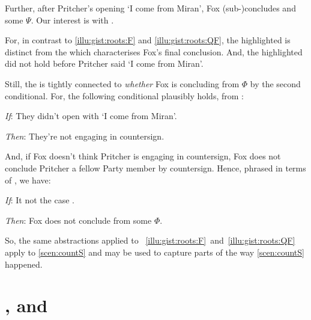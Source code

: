 \begin{note}
  Further, after Pritcher's opening `I come from Miran', Fox (sub-)concludes  and some \pool{} \(\Psi\).
  Our interest is with .

  For, in contrast to  \ref{illu:gist:roots:F} and \ref{illu:gist:roots:QF}, the highlighted \fofr{} is distinct from the \fofr{} which characterises Fox's final conclusion.
  And, the highlighted \fofr{} did not hold before Pritcher said `I come from Miran'.

  Still, the \fofr{} is tightly connected to \emph{whether} Fox is concluding  from \(\Phi\) by the second conditional.
  For, the following conditional plausibly holds, from :

  \begin{itenum}
  \item[\emph{If}:]
    They didn't open with `I come from Miran'.
  \item[\emph{Then}:]
    They're not engaging in countersign.
  \end{itenum}

  \noindent%
  And, if Fox doesn't think Pritcher is engaging in countersign, Fox does not conclude Pritcher a fellow Party member by countersign.
  Hence, phrased in terms of , we have:
  \begin{itenum}
  \item[\emph{If}:]
    It not the case .
  \item[\emph{Then}:]
    Fox does not conclude  from some \pool{} \(\Phi\).
  \end{itenum}
  So, the same abstractions applied to ~\ref{illu:gist:roots:F}~and~\ref{illu:gist:roots:QF} apply to \autoref{scen:countS} and may be used to capture parts of the way \autoref{scen:countS} happened.
\end{note}



\section*{\qWhy{}, \qHow{} and \issueInclusion{}}
\label{cha:intro:why-how}


